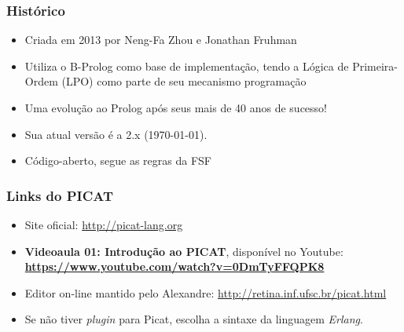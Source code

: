 \begin{frame}

    \frametitle{Histórico}

    \begin{itemize}
      \item Criada em 2013 por Neng-Fa Zhou e Jonathan Fruhman

      \item Utiliza o B-Prolog como base de implementação, tendo
      a Lógica de Primeira-Ordem (LPO) como parte de seu mecanismo programação

\pause
      \item Uma evolução ao Prolog após seus mais de 40 anos de sucesso!

\pause
      \item Sua atual versão é a 2.x (\today).
\pause
      \item Código-aberto, segue as regras da FSF

    \end{itemize}
\end{frame}


\begin{frame}[fragile]
  \frametitle{Links do PICAT}

  \begin{itemize}
   	\item Site oficial:   \hspace{8mm} \url{http://picat-lang.org}

  \item   \textbf{Videoaula 01: Introdução ao PICAT}, disponível no Youtube:\\
    \textbf{\url {https://www.youtube.com/watch?v=0DmTyFFQPK8}}


  \pause
   	\item Editor on-line mantido pelo Alexandre: \url{http://retina.inf.ufsc.br/picat.html}
     
    \pause
    \item Se não tiver \textit{plugin} para Picat, escolha a sintaxe da linguagem \textit{Erlang}.
    
  \end{itemize}

\end{frame}




